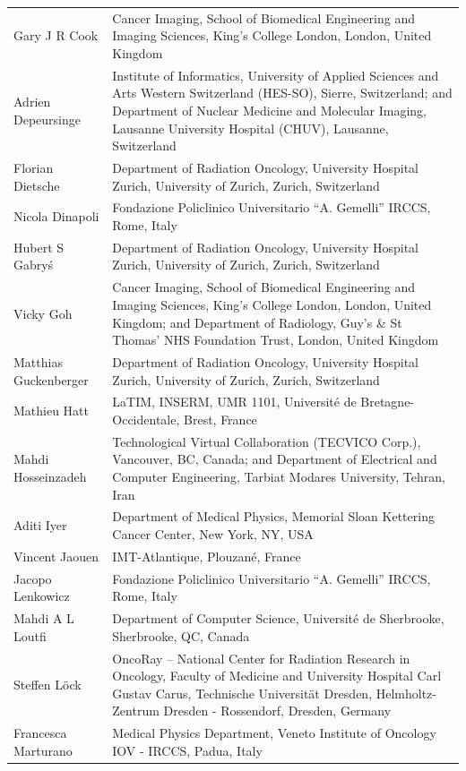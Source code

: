 \documentclass[fleqn,a4paper,oneside,openany]{book}
\begin{document}
\begin{longtable}{p{4cm}p{10cm}}
Gary J R Cook & Cancer Imaging, School of Biomedical Engineering and Imaging Sciences, King's College London, London, United Kingdom\\
Adrien Depeursinge & Institute of Informatics, University of Applied Sciences and Arts Western Switzerland (HES-SO), Sierre, Switzerland; and Department of Nuclear Medicine and Molecular Imaging, Lausanne University Hospital (CHUV), Lausanne, Switzerland\\
Florian Dietsche & Department of Radiation Oncology, University Hospital Zurich, University of Zurich, Zurich, Switzerland\\
Nicola Dinapoli & Fondazione Policlinico Universitario “A. Gemelli” IRCCS, Rome, Italy\\
Hubert S Gabryś & Department of Radiation Oncology, University Hospital Zurich, University of Zurich, Zurich, Switzerland\\
Vicky Goh & Cancer Imaging, School of Biomedical Engineering and Imaging Sciences, King's College London, London, United Kingdom; and Department of Radiology, Guy's \& St Thomas' NHS Foundation Trust, London, United Kingdom\\
Matthias Guckenberger & Department of Radiation Oncology, University Hospital Zurich, University of Zurich, Zurich, Switzerland\\
Mathieu Hatt & LaTIM, INSERM, UMR 1101, Université de Bretagne-Occidentale, Brest, France\\
Mahdi Hosseinzadeh & Technological Virtual Collaboration (TECVICO Corp.), Vancouver, BC, Canada; and Department of Electrical and Computer Engineering, Tarbiat Modares University, Tehran, Iran\\
Aditi Iyer & Department of Medical Physics, Memorial Sloan Kettering Cancer Center, New York, NY, USA\\
Vincent Jaouen & IMT-Atlantique, Plouzané, France\\
Jacopo Lenkowicz & Fondazione Policlinico Universitario “A. Gemelli” IRCCS, Rome, Italy\\
Mahdi A L Loutfi & Department of Computer Science, Université de Sherbrooke, Sherbrooke, QC, Canada\\
Steffen Löck & OncoRay – National Center for Radiation Research in Oncology, Faculty of Medicine and University Hospital Carl Gustav Carus, Technische Universität Dresden, Helmholtz-Zentrum Dresden - Rossendorf, Dresden, Germany\\
Francesca Marturano & Medical Physics Department, Veneto Institute of Oncology IOV - IRCCS, Padua, Italy\\

\end{longtable}
\end{document}
